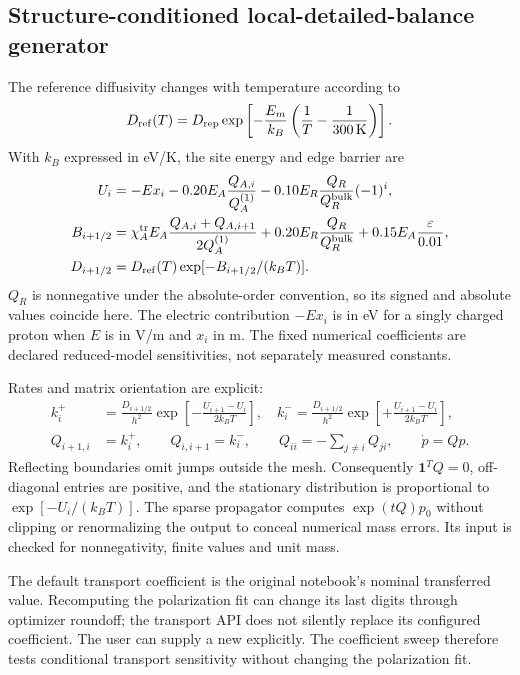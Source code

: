 \documentclass[11pt,a4paper]{article}
\newcommand{\code}[1]{\texttt{\detokenize{#1}}}
\begin{document}
\subsection{Structure-conditioned local-detailed-balance generator}

The reference diffusivity changes with temperature according to
\begin{equation}
 D_{\rm ref}(T)=D_{\rm rep}\exp\left[-\frac{E_m}{k_B}\left(\frac1T-\frac1{300\,\mathrm K}\right)\right].
\end{equation}
With $k_B$ expressed in eV/K, the site energy and edge barrier are
\begin{align}
 U_i &=-Ex_i-0.20E_A\frac{Q_{A,i}}{Q_A^{(1)}}
       -0.10E_R\frac{Q_R}{Q_R^{\rm bulk}}(-1)^i,\\
 B_{i+1/2} &=\chi_A^{\rm tr}E_A\frac{Q_{A,i}+Q_{A,i+1}}{2Q_A^{(1)}}
       +0.20E_R\frac{Q_R}{Q_R^{\rm bulk}}
       +0.15E_A\frac{\varepsilon}{0.01},\\
 D_{i+1/2}&=D_{\rm ref}(T)\exp[-B_{i+1/2}/(k_BT)].
\end{align}
$Q_R$ is nonnegative under the absolute-order convention, so its signed and absolute values coincide here. The electric contribution $-Ex_i$ is in eV for a singly charged proton when $E$ is in V/m and $x_i$ in m. The fixed numerical coefficients are declared reduced-model sensitivities, not separately measured constants.

Rates and matrix orientation are explicit:
\begin{align}
 k_i^+&=\frac{D_{i+1/2}}{h^2}\exp\left[-\frac{U_{i+1}-U_i}{2k_BT}\right],\quad
 k_i^-=\frac{D_{i+1/2}}{h^2}\exp\left[+\frac{U_{i+1}-U_i}{2k_BT}\right],\\
 Q_{i+1,i}&=k_i^+,\qquad Q_{i,i+1}=k_i^-,\qquad
 Q_{ii}=-\sum_{j\ne i}Q_{ji},\qquad \dot p=Qp.
 \label{eq:generator}
\end{align}
Reflecting boundaries omit jumps outside the mesh. Consequently $\mathbf1^TQ=0$, off-diagonal entries are positive, and the stationary distribution is proportional to $\exp[-U_i/(k_BT)]$. The sparse propagator computes $\exp(tQ)p_0$ without clipping or renormalizing the output to conceal numerical mass errors. Its input is checked for nonnegativity, finite values and unit mass.

The default transport coefficient is the original notebook's nominal transferred value. Recomputing the polarization fit can change its last digits through optimizer roundoff; the transport API does not silently replace its configured coefficient. The user can supply a new \code{DeviceConfig} explicitly. The coefficient sweep therefore tests conditional transport sensitivity without changing the polarization fit.
\end{document}
